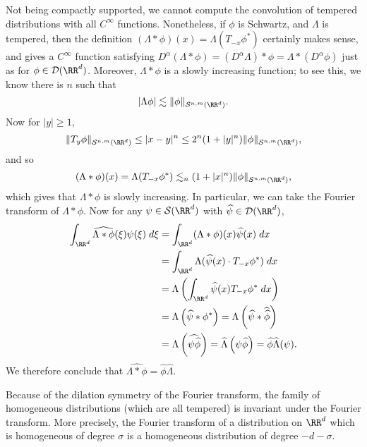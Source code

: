 Not being compactly supported, we cannot compute the convolution of tempered distributions with all $C^\infty$ functions. Nonetheless, if $\phi$ is Schwartz, and $\Lambda$ is tempered, then the definition $(\Lambda * \phi)(x) = \Lambda(T_{-x} \phi^*)$ certainly makes sense, and gives a $C^\infty$ function satisfying $D^\alpha(\Lambda * \phi) = (D^\alpha \Lambda) * \phi = \Lambda * (D^\alpha \phi)$ just as for $\phi \in \mathcal{D}(\RR^d)$. Moreover, $\Lambda * \phi$ is a slowly increasing function; to see this, we know there is $n$ such that
%
\[ |\Lambda \phi| \lesssim \| \phi \|_{\mathcal{S}^{n,m}(\RR^d)}. \]
%
Now for $|y| \geq 1$,
%
\[ \| T_y \phi \|_{\mathcal{S}^{n,m}(\RR^d)} \leq |x-y|^n \leq 2^n (1 + |y|^n) \| \phi \|_{\mathcal{S}^{n,m}(\RR^d)}, \]
%
and so
%
\[ (\Lambda * \phi)(x) = \Lambda(T_{-x} \phi^*) \lesssim_n (1 + |x|^n) \| \phi \|_{\mathcal{S}^{n,m}(\RR^d)}, \]
%
which gives that $\Lambda * \phi$ is slowly increasing. In particular, we can take the Fourier transform of $\Lambda * \phi$. Now for any $\psi \in \mathcal{S}(\RR^d)$ with $\widehat{\psi} \in \mathcal{D}(\RR^d)$,
%
\begin{align*}
  \int_{\RR^d} \widehat{\Lambda * \phi}(\xi) \psi(\xi)\; d\xi &= \int_{\RR^d} (\Lambda * \phi)(x) \widehat{\psi}(x)\; dx\\
  &= \int_{\RR^d} \Lambda( \widehat{\psi}(x) \cdot T_{-x} \phi^*)\; dx\\
  &= \Lambda \left( \int_{\RR^d} \widehat{\psi}(x) T_{-x} \phi^*\; dx \right)\\
  &= \Lambda \left( \widehat{\psi} * \phi^* \right) = \Lambda \left( \widehat{\psi} * \widehat{\widehat{\phi}} \right)\\
  &= \Lambda \left( \widehat{\psi \widehat{\phi}} \right) = \widehat{\Lambda} \left( \psi \widehat{\phi} \right) = \widehat{\phi} \widehat{\Lambda}(\psi).
\end{align*}
%
We therefore conclude that $\widehat{\Lambda * \phi} = \widehat{\phi} \widehat{\Lambda}$.

Because of the dilation symmetry of the Fourier transform, the family of homogeneous distributions (which are all tempered) is invariant under the Fourier transform. More precisely, the Fourier transform of a distribution on $\RR^d$ which is homogeneous of degree $\sigma$ is a homogeneous distribution of degree $-d - \sigma$.

